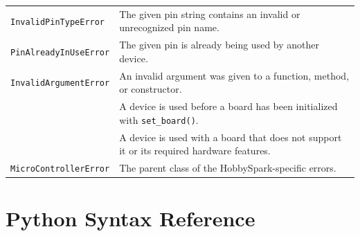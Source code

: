 \documentclass[11pt]{book}
\newcommand{\error}[1]{\texttt{\seqsplit{#1}}}
\begin{document}
\begin{longtable}{p{} p{}}
    \texttt{InvalidPinTypeError} &
    The given pin string contains an invalid or unrecognized pin name. \\

    \texttt{PinAlreadyInUseError} &
    The given pin is already being used by another device. \\

    \texttt{InvalidArgumentError} &
    An invalid argument was given to a function, method, or constructor. \\

    \error{BoardNotInitializedFirstError} &
    A device is used before a board has been initialized with \texttt{set\_board()}. \\

    \error{DeviceNotCompatibleWithCurrentBoardError} &
    A device is used with a board that does not support it or its required hardware features. \\

    \texttt{MicroControllerError} &
    The parent class of the HobbySpark-specific errors. \\

\end{longtable}
\chapter{Python Syntax Reference}
\end{document}

